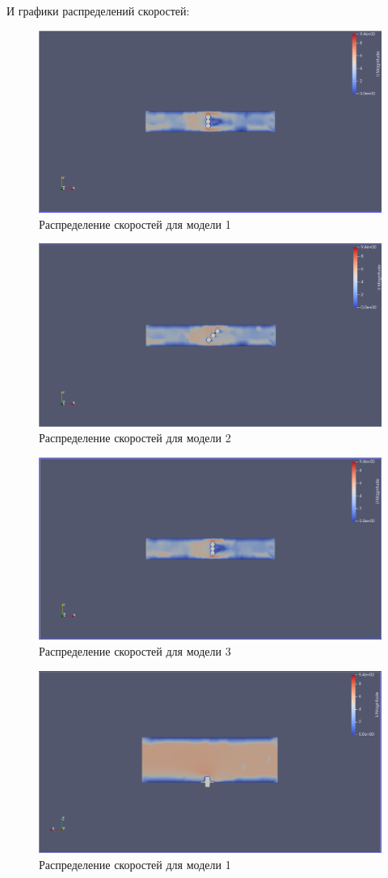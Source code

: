 \documentclass[a4paper,12pt]{article}
\theoremstyle{plain} %
\theoremstyle{definition} %
\theoremstyle{remark} %
\begin{document}
\par
И графики распределений скоростей:
\begin{figure}[h]
	\begin{center}
		\includegraphics[width=0.4\linewidth]{8.1.png}
		\caption{Распределение скоростей для модели 1} %
	\end{center}
\end{figure}

\begin{figure}[h]
	\begin{center}
		\includegraphics[width=0.4\linewidth]{8.2.png}
		\caption{Распределение скоростей для модели 2} %
	\end{center}
\end{figure}
\newpage
\begin{figure}[h]
	\begin{center}
		\includegraphics[width=0.4\linewidth]{8.3.png}
		\caption{Распределение скоростей для модели 3} %
	\end{center}
\end{figure}
\begin{figure}[h]
	\begin{center}
		\includegraphics[width=0.4\linewidth]{9.png}
		\caption{Распределение скоростей для модели 1} %
	\end{center}
\end{figure}
\end{document}
